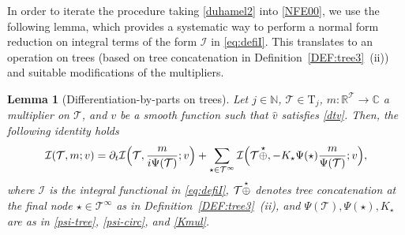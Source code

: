 \documentclass[a4paper,
11pt,  reqno]{amsart}
\makeatletter
\newcommand{\5}{\textup{V}}
\newcommand{\ft}{\widehat}
\newcommand{\dt}{\partial_t}
\newtheorem{lemma}[theorem]{Lemma}
\theoremstyle{remark}
\newcommand{\R}{\mathbb{R}}
\newcommand{\bbC}{\mathbb{C}}
\newcommand{\TT}{\mathcal{T}}
\newcommand{\Tr}{\mathrm{T}}
\newcommand{\N}{\mathbb{N}}
\def\<#1>{\csname MH@symb@#1\endcsname}
\newcommand{\Ical}{\mathcal{I}}
\numberwithin{equation}{section}
\numberwithin{theorem}{section}
\makeatother
\begin{document}
In order to iterate the procedure taking \eqref{duhamel2} into \eqref{NFE00}, we use the following lemma, which provides a systematic way to perform a normal form reduction on integral terms of the form $\Ical$ in \eqref{eq:defiI}. This translates to an operation on trees (based on tree concatenation in Definition~\ref{DEF:tree3}~(ii)) and suitable modifications of the multipliers. 


\begin{lemma}[Differentiation-by-parts on trees]
\label{LEM:IBP}
Let $j\in\N$, $\TT\in\Tr_j$, $m: \R^{\TT}\to \bbC$ a multiplier on $\TT$,
and $v$ be a smooth function such that $\ft v$ satisfies  \eqref{dtv}. Then, the following identity holds
\begin{align}\label{IBP}
\begin{split}
\Ical (\TT,m; v)
= \dt \Ical \Big(\TT,\frac{m}{ i \Psi(\TT)} ; v \Big)
+ \sum_{\star \in \TT^\infty} \Ical 
\Big(\TT \overset{\star}{\oplus} \<1>
, - K_\star \Psi(\star) \frac{m}{\Psi(\TT)} ; v \Big)
,
\end{split}
\end{align}
where $\Ical$ is the integral  functional in \eqref{eq:defiI}, $\TT \overset{\star}{\oplus} \<1> $ denotes tree concatenation at the final node $\star\in \TT^\infty$ as in Definition~\ref{DEF:tree3}~(ii), and $\Psi(\TT), \Psi(\star),  K_\star$ are as in \eqref{psi-tree}, \eqref{psi-circ}, and \eqref{Kmul}.

\end{lemma}
\end{document}
